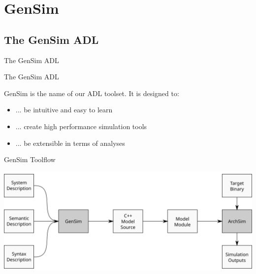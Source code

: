 \section{GenSim}

\subsection{The GenSim ADL}

\begin{frame}{The GenSim ADL}

\end{frame}

\begin{frame}{The GenSim ADL}

GenSim is the name of our ADL toolset. It is designed to:

\begin{itemize}
	\item ... be intuitive and easy to learn
	\item ... create high performance simulation tools
	\item ... be extensible in terms of analyses

\end{itemize}

\end{frame}

\begin{frame}{GenSim Toolflow}

\centering
\includegraphics[width=\textwidth]{figures/gensim-toolflow}

\end{frame}

